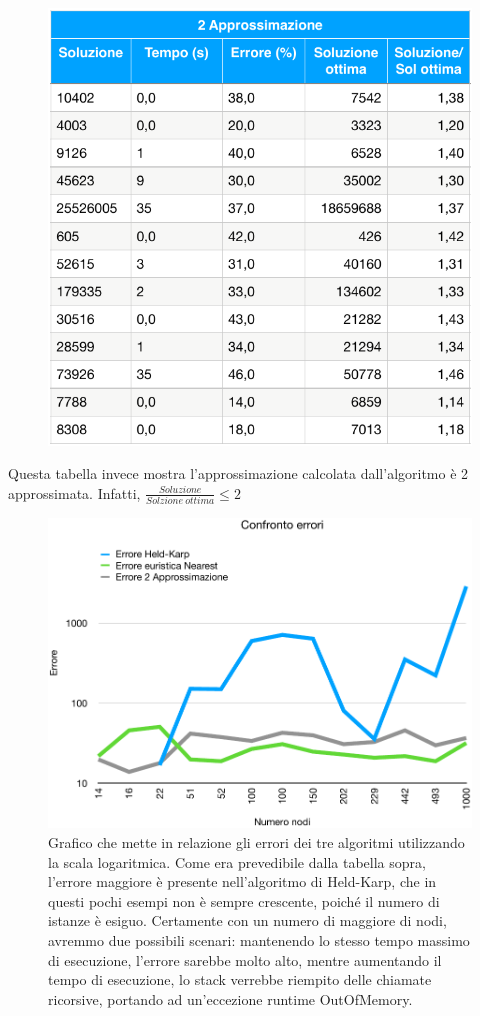 \documentclass[a4paper]{article}
\begin{document}
\begin{figure}[H]
	\centering
	\includegraphics[width=0.5\linewidth]{2approx}
	\label{fig:2approx}
\end{figure}
Questa tabella invece mostra l'approssimazione calcolata dall'algoritmo è 2 approssimata. Infatti,
$\frac{Soluzione}{Solzione\ ottima} \leq 2$
\begin{figure}[H]
	\begin{center}
	\includegraphics[width=17cm]{errore}
	\caption{Grafico che mette in relazione gli errori dei tre algoritmi utilizzando la scala logaritmica. Come era prevedibile dalla tabella sopra, l'errore maggiore è presente nell'algoritmo di Held-Karp, che in questi pochi esempi non è sempre crescente, poiché il numero di istanze è esiguo. Certamente con un numero di maggiore di nodi, avremmo due possibili scenari: mantenendo lo stesso tempo massimo di esecuzione, l'errore sarebbe molto alto, mentre aumentando il tempo di esecuzione, lo stack verrebbe riempito delle chiamate ricorsive, portando ad un'eccezione runtime OutOfMemory.}	\label{fig:errore}
\end{center}
\end{figure}
\end{document}
